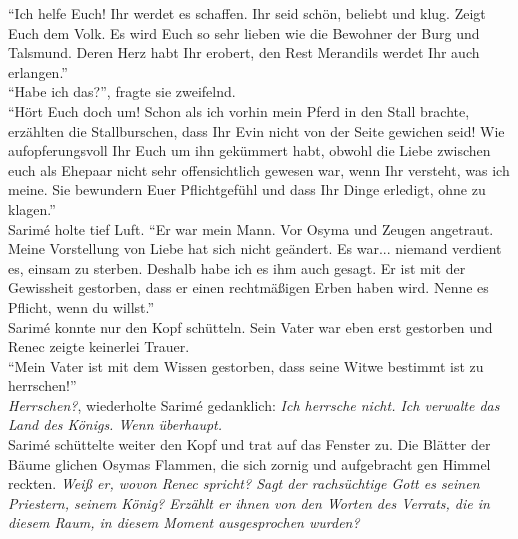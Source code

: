 ``Ich helfe Euch! Ihr werdet es schaffen. Ihr seid schön, beliebt und klug. Zeigt Euch dem Volk. Es 
wird Euch so sehr lieben wie die Bewohner der Burg und Talsmund. Deren Herz habt Ihr erobert, den 
Rest Merandils werdet Ihr auch erlangen.''\\
``Habe ich das?'', fragte sie zweifelnd.\\
``Hört Euch doch um! Schon als ich vorhin mein Pferd in den Stall brachte, erzählten die 
Stallburschen, dass Ihr Evin nicht von der Seite gewichen seid! Wie aufopferungsvoll Ihr Euch um 
ihn gekümmert habt, obwohl die Liebe zwischen euch als Ehepaar nicht sehr offensichtlich gewesen 
war, wenn Ihr versteht, was ich meine. Sie bewundern Euer Pflichtgefühl und dass Ihr Dinge 
erledigt, ohne zu klagen.''\\
Sarimé holte tief Luft. ``Er war mein Mann. Vor Osyma und Zeugen angetraut. Meine Vorstellung von 
Liebe hat sich nicht geändert. Es war... niemand verdient es, einsam zu sterben. Deshalb habe ich 
es ihm auch gesagt. Er ist mit der Gewissheit gestorben, dass er einen rechtmäßigen Erben haben 
wird. Nenne es Pflicht, wenn du willst.''\\ 
Sarimé konnte nur den Kopf schütteln. Sein Vater war eben erst gestorben und Renec zeigte keinerlei 
Trauer.\\
``Mein Vater ist mit dem Wissen gestorben, dass seine Witwe bestimmt ist zu herrschen!''\\
\textit{Herrschen?}, wiederholte Sarimé gedanklich: \textit{Ich herrsche nicht. Ich verwalte das 
Land des Königs. Wenn überhaupt.}\\
Sarimé schüttelte weiter den Kopf und trat auf das Fenster zu. Die Blätter der Bäume glichen Osymas 
Flammen, die sich zornig und aufgebracht gen Himmel reckten. \textit{Weiß er, wovon Renec spricht? 
Sagt der rachsüchtige Gott es seinen Priestern, seinem König? Erzählt er ihnen von den Worten des 
Verrats, die in diesem Raum, in diesem Moment ausgesprochen wurden?}\\
